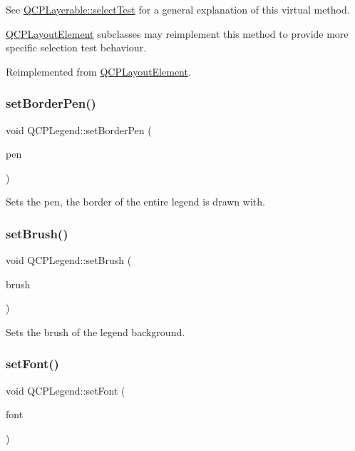 See \mbox{\hyperlink{class_q_c_p_layerable_a04db8351fefd44cfdb77958e75c6288e}{Q\+C\+P\+Layerable\+::select\+Test}} for a general explanation of this virtual method.

\mbox{\hyperlink{class_q_c_p_layout_element}{Q\+C\+P\+Layout\+Element}} subclasses may reimplement this method to provide more specific selection test behaviour. 

Reimplemented from \mbox{\hyperlink{class_q_c_p_layout_element_ae97f483cccedadbf18ea4525ef240ee4}{Q\+C\+P\+Layout\+Element}}.

\mbox{\label{class_q_c_p_legend_a866a9e3f5267de7430a6c7f26a61db9f}} 
\subsubsection{\texorpdfstring{setBorderPen()}{setBorderPen()}}
{\footnotesize\ttfamily void Q\+C\+P\+Legend\+::set\+Border\+Pen (\begin{DoxyParamCaption}\item[{const Q\+Pen \&}]{pen }\end{DoxyParamCaption})}

Sets the pen, the border of the entire legend is drawn with. \mbox{\label{class_q_c_p_legend_a497bbcd38baa3598c08e2b3f48103f23}} 
\subsubsection{\texorpdfstring{setBrush()}{setBrush()}}
{\footnotesize\ttfamily void Q\+C\+P\+Legend\+::set\+Brush (\begin{DoxyParamCaption}\item[{const Q\+Brush \&}]{brush }\end{DoxyParamCaption})}

Sets the brush of the legend background. \mbox{\label{class_q_c_p_legend_aa4cda8499e3cb0f3be415edc02984c73}} 
\subsubsection{\texorpdfstring{setFont()}{setFont()}}
{\footnotesize\ttfamily void Q\+C\+P\+Legend\+::set\+Font (\begin{DoxyParamCaption}\item[{const Q\+Font \&}]{font }\end{DoxyParamCaption})}

